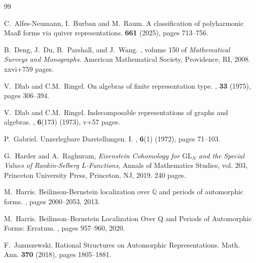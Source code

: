 \documentclass[a4paper,12pt,reqno]{amsart}
\theoremstyle{plain}
\theoremstyle{remark}
\begin{document}
    
    \begin{thebibliography}{99}

      C.~Alfes-Neumann, I.~Burban and M.~Raum.
      \newblock A classification of polyharmonic Maa\ss{} forms via quiver representations.
       \textbf{661} (2025),
      pages 713--756.

      B.~Deng, J.~Du, B.~Parshall, and J.~Wang.
      , volume 150 of {\em Mathematical Surveys and Monographs}.
      \newblock American Mathematical Society, Providence, RI, 2008.
      xxvi+759 pages.

      V.~Dlab and C.M.~Ringel.
      \newblock On algebras of finite representation type.
      , {\bf 33} (1975),
      pages 306--394.

       V.~Dlab and C.M.~Ringel.
       \newblock Indecomposable representations of graphs and algebras.
       , {\bf 6}(173) (1973),
       v+57 pages.

      P.~Gabriel.
      \newblock Unzerlegbare Darstellungen. I.
      , {\bf 6}(1) (1972),
      pages 71--103.

      G.~Harder and A.~Raghuram, \emph{Eisenstein Cohomology for $\mathrm{GL}_N$ and the Special Values of Rankin-Selberg $L$-Functions},
      \newblock Annals of Mathematics Studies, vol. 203, Princeton University Press, Princeton, NJ, 2019.
      240 pages.

      M.~Harris.
      \newblock Beilinson-Bernstein localization over {${\mathbb{Q}}$} and periods
      of automorphic forms.
      ,
      pages 2000--2053, 2013.
      
      M.~Harris.
      \newblock Beilinson--Bernstein Localization Over {Q} and Periods
      of Automorphic Forms: Erratum.
      ,
      pages 957--960, 2020.

      F.~Januszewski.
      \newblock Rational Structures on Automorphic Representations.
      \newblock Math. Ann. {\bf 370} (2018),
      pages 1805--1881.

      
    \end{thebibliography}
\end{document}
